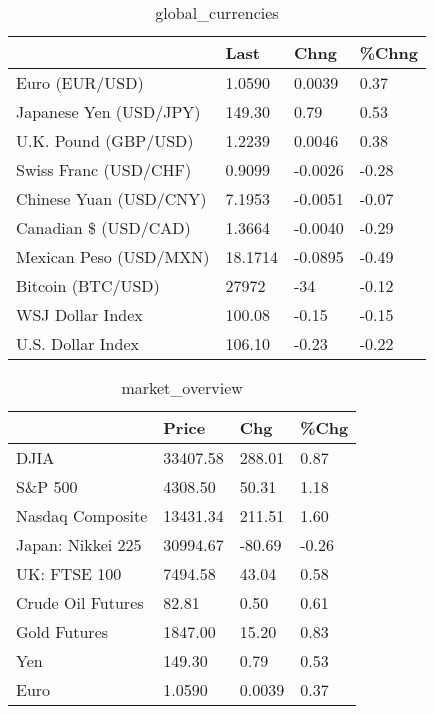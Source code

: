 \documentclass{article}%
\begin{document}
%


\begin{table}[htbp]%
\caption{global\_currencies}%
\centering%
\begin{adjustbox}{width=1\textwidth}%
\begin{tabular}{llll}
\toprule
                       &    Last &    Chng & \%Chng \\
\midrule
        Euro (EUR/USD) &  1.0590 &  0.0039 &  0.37 \\
Japanese Yen (USD/JPY) &  149.30 &    0.79 &  0.53 \\
  U.K. Pound (GBP/USD) &  1.2239 &  0.0046 &  0.38 \\
 Swiss Franc (USD/CHF) &  0.9099 & -0.0026 & -0.28 \\
Chinese Yuan (USD/CNY) &  7.1953 & -0.0051 & -0.07 \\
  Canadian \$ (USD/CAD) &  1.3664 & -0.0040 & -0.29 \\
Mexican Peso (USD/MXN) & 18.1714 & -0.0895 & -0.49 \\
     Bitcoin (BTC/USD) &   27972 &     -34 & -0.12 \\
      WSJ Dollar Index &  100.08 &   -0.15 & -0.15 \\
     U.S. Dollar Index &  106.10 &   -0.23 & -0.22 \\
\bottomrule
\end{tabular}
%
\end{adjustbox}%
\end{table}

%


\begin{table}[htbp]%
\caption{market\_overview}%
\centering%
\begin{adjustbox}{width=1\textwidth}%
\begin{tabular}{llll}
\toprule
                  &    Price &    Chg &  \%Chg \\
\midrule
             DJIA & 33407.58 & 288.01 &  0.87 \\
          S\&P 500 &  4308.50 &  50.31 &  1.18 \\
 Nasdaq Composite & 13431.34 & 211.51 &  1.60 \\
Japan: Nikkei 225 & 30994.67 & -80.69 & -0.26 \\
     UK: FTSE 100 &  7494.58 &  43.04 &  0.58 \\
Crude Oil Futures &    82.81 &   0.50 &  0.61 \\
     Gold Futures &  1847.00 &  15.20 &  0.83 \\
              Yen &   149.30 &   0.79 &  0.53 \\
             Euro &   1.0590 & 0.0039 &  0.37 \\
\bottomrule
\end{tabular}
%
\end{adjustbox}%
\end{table}

%
\end{document}
